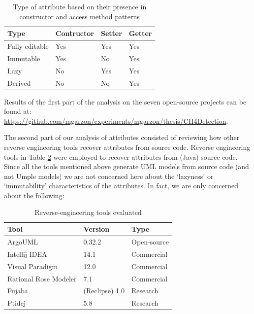 \begin{table}
\caption{Type of attribute based on their presence in constructor and access method patterns}
\label{table:constructorFrequency}
\centering
\begin{tabular}{llll}
\toprule
\rowcolor[HTML]{BBDAFF}
\textbf{Type}   & \textbf{Contructor}    & \textbf{Setter}       &  \textbf{Getter} \\ 
\hline
 Fully editable & Yes & Yes & Yes \\
  Immutable & Yes & No & Yes \\
   Lazy & No & Yes & Yes \\
    Derived & No & No & Yes \\
\hline
\end{tabular}
\end{table}

Results of the first part of the analysis on the seven open-source projects can be found at:
\url{https://github.com/mgarzon/experiments/mgarzon/thesis/CH4Detection}.

The second part of our analysis of attributes consisted of reviewing how other reverse engineering tools 
recover attributes from source code. Reverse engineering tools in Table \ref{table:toolsReverse} were employed to recover attributes from (Java) source code. Since all the tools mentioned above generate UML models from source code (and not Umple models) we are not concerned here about the `lazyness' or `immutability' characteristics of the attributes. In fact, we are only concerned about the following:

\begin{table}[h]
\caption{Reverse-engineering tools evaluated}
\label{table:toolsReverse}
\centering
\begin{tabular}{lll}
\toprule
\rowcolor[HTML]{BBDAFF}
\textbf{Tool}   & \textbf{Version}  & \textbf{Type}\\ 
\hline
 ArgoUML \cite{ArgoUML} & 0.32.2 & Open-source \\
 Intellij IDEA \cite{IdeaTool} & 14.1 & Commercial \\
 Visual Paradigm \cite{VisualParadigm} & 12.0 & Commercial  \\
 Rational Rose Modeler  \cite{ROSE} & 7.1 & Commercial\\
 Fujaba \cite{Fujaba} & (Reclipse) 1.0 & Research\\
 Ptidej \cite{ptidejTool} & 5.8 & Research\\
\hline
\end{tabular}
\end{table}

